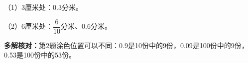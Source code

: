 
\begingroup\color{answerred}\par\endgroup
{}
\begingroup\color{answerred}\par\noindent\begin{center}\end{center}\par\endgroup
{}
\begingroup\color{answerred}\noindent（1）3厘米处：$0.3$分米。\par
\noindent（2）6厘米处：$\dfrac6{10}$分米、$0.6$分米。\par\par\endgroup
{}
\begingroup\color{answerred}\par\noindent\begin{center}\end{center}\par\endgroup

\begingroup\color{answerred}\textbf{多解核对：}第2题涂色位置可以不同：0.9是10份中的9份，0.09是100份中的9份，0.53是100份中的53份。\par\endgroup
